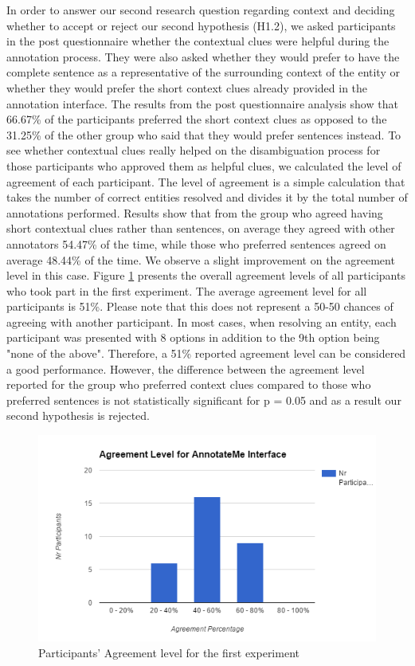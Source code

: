 In order to answer our second research question regarding context and deciding whether to accept or reject our second hypothesis (H1.2), we asked participants in the post questionnaire whether the contextual clues were helpful during the annotation process. They were also asked whether they would prefer to have the complete sentence as a representative of the surrounding context of the entity or whether they would prefer the short context clues already provided in the annotation interface. The results from the post questionnaire analysis show that 66.67\% of the participants preferred the short context clues as opposed to the 31.25\% of the other group who said that they would prefer sentences instead. To see whether contextual clues really helped on the disambiguation process for those participants who approved them as helpful clues, we calculated the level of agreement of each participant. The level of agreement is a simple calculation that takes the number of correct entities resolved and divides it by the total number of annotations performed. Results show that from the group who agreed having short contextual clues rather than sentences, on average they agreed with other annotators 54.47\% of the time, while those who preferred sentences agreed on average 48.44\% of the time. We observe a slight improvement on the agreement level in this case. Figure \ref{fig:ex1-agreementlevel} presents the overall agreement levels of all participants who took part in the first experiment. The average agreement level for all participants is 51\%. Please note that this does not represent a 50-50 chances of agreeing with another participant. In most cases, when resolving an entity, each participant was presented with 8 options in addition to the 9th option being "none of the above". Therefore, a 51\% reported agreement level can be considered a good performance. However, the difference between the agreement level reported for the group who preferred context clues compared to those who preferred sentences is not statistically significant for p = 0.05 and as a result our second hypothesis is rejected. 

\begin{figure}[]
  \includegraphics[width=\linewidth]{figures/experiment1/exp1-agreementlevel.PNG}
  \caption{Participants' Agreement level for the first experiment}
  \label{fig:ex1-agreementlevel}
\end{figure}
 

